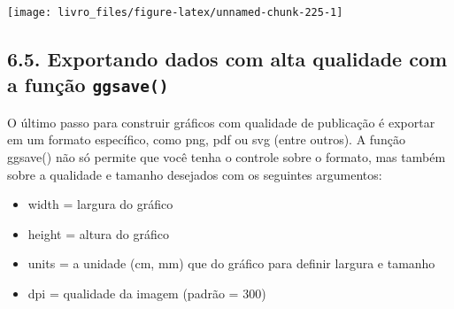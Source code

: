 \documentclass[
]{book}
\begin{document}
\begin{center}\texttt{[image: livro\_files/figure-latex/unnamed-chunk-225-1]} \end{center}

\hypertarget{exportando-dados-com-alta-qualidade-com-a-funuxe7uxe3o-ggsave}{%
\subsection{\texorpdfstring{6.5. Exportando dados com alta qualidade com a função \texttt{ggsave()}}{6.5. Exportando dados com alta qualidade com a função ggsave()}}\label{exportando-dados-com-alta-qualidade-com-a-funuxe7uxe3o-ggsave}}

O último passo para construir gráficos com qualidade de publicação é exportar em um formato específico, como png, pdf ou svg (entre outros). A função ggsave() não só permite que você tenha o controle sobre o formato, mas também sobre a qualidade e tamanho desejados com os seguintes argumentos:

\begin{itemize}
\item
  width = largura do gráfico
\item
  height = altura do gráfico
\item
  units = a unidade (cm, mm) que do gráfico para definir largura e tamanho
\item
  dpi = qualidade da imagem (padrão = 300)
\end{itemize}
\end{document}

